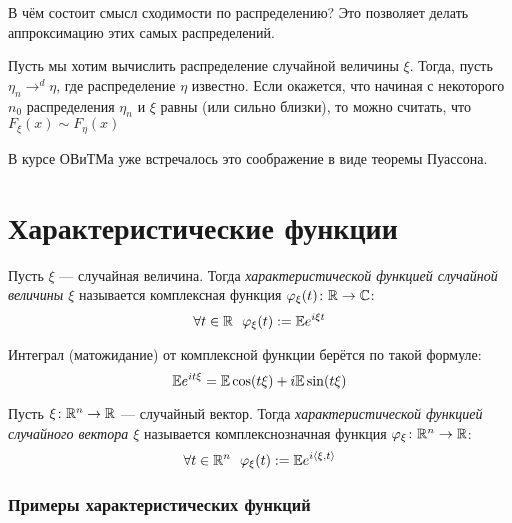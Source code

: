\begin{note}
	В чём состоит смысл сходимости по распределению? Это позволяет делать аппроксимацию этих самых распределений.
	
	Пусть мы хотим вычислить распределение случайной величины $\xi$. Тогда, пусть $\eta_n \to^d \eta$, где распределение $\eta$ известно. Если окажется, что начиная с некоторого $n_0$ распределения $\eta_n$ и $\xi$ равны (или сильно близки), то можно считать, что $F_\xi(x) \sim F_\eta(x)$
\end{note}

\begin{example}
	В курсе ОВиТМа уже встречалось это соображение в виде теоремы Пуассона.
\end{example}

\section{Характеристические функции}

\begin{definition}
	Пусть $\xi$ --- случайная величина. Тогда \textit{характеристической функцией случайной величины $\xi$} называется комплексная функция $\varphi_\xi(t) \colon \mathbb{R} \to \mathbb{C}$:
	\[
		\forall t \in \mathbb{R}\ \ \varphi_\xi(t) := \mathbb{E} e^{i\xi t}
	\]
\end{definition}

\begin{note}
	Интеграл (матожидание) от комплексной функции берётся по такой формуле:
	\[
		\mathbb{E} e^{it\xi} = \mathbb{E}\cos(t\xi) + i\mathbb{E}\sin(t\xi)
	\]
\end{note}

\begin{definition}
	Пусть $\xi \colon \mathbb{R}^n \to \mathbb{R}$ --- случайный вектор. Тогда \textit{характеристической функцией случайного вектора $\xi$} называется комплекснозначная функция $\varphi_\xi \colon \mathbb{R}^n \to \mathbb{R}$:
	\[
		\forall t \in \mathbb{R}^n\ \ \varphi_\xi(t) := \mathbb{E} e^{i\left\langle\xi, t\right\rangle}
	\]
\end{definition}

\subsubsection*{Примеры характеристических функций}

